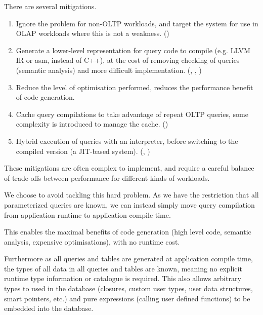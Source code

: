 \documentclass[conference]{IEEEtran}
\begin{document}
There are several mitigations.
\begin{enumerate}
    \item Ignore the problem for non-OLTP workloads, and target the system for use in OLAP workloads where this is not a weakness. (\cite{HIQUE}) %
    \item Generate a lower-level representation for query code to compile (e.g. LLVM IR or asm, instead of C++), at the cost of
          removing checking of queries (semantic analysis) and more difficult implementation. (\cite{HyperEfficientCompilation}, \cite{AdaptiveExecution}, \cite{PracticalCodegen}) %
    \item Reduce the level of optimisation performed, reduces the performance benefit of code generation.
    \item Cache query compilations to take advantage of repeat OLTP queries, some complexity is introduced to manage the cache. (\cite{MemSQL}) %
    \item Hybrid execution of queries with an interpreter, before switching to the compiled version (a JIT-based system). (\cite{wagner2024incremental}, \cite{AdaptiveExecution}) %
\end{enumerate}
These mitigations are often complex to implement, and require a careful balance of trade-offs between performance for different 
kinds of workloads.

We choose to avoid tackling this hard problem. As we have the restriction that all parameterized queries are 
known, we can instead simply move query compilation from application runtime to application compile time.

This enables the maximal benefits of code generation (high level code, semantic analysis, expensive 
optimisations), with no runtime cost.

Furthermore as all queries and tables are generated at application compile time, the types of all data in all queries
and tables are known, meaning no explicit runtime type information or catalogue is required. This also allows arbitrary
types to used in the database (closures, custom user types, user data structures, smart pointers, etc.) and pure expressions 
(calling user defined functions) to be embedded into the database.
\end{document}
